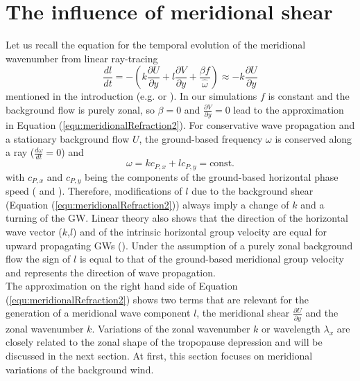 
\section{The influence of meridional shear}
\label{sec:3D_shear}
Let us recall the equation for the temporal evolution of the meridional wavenumber from linear ray-tracing
\begin{equation}
    \frac{dl}{dt} = -(k \frac{\partial U}{\partial y} + l \frac{\partial V}{\partial y} + \frac{\beta f}{\hat{\omega}})
    \approx -k \frac{\partial U}{\partial y}
    \label{equ:meridionalRefraction2}
\end{equation}
mentioned in the introduction (e.g. \cite[]{dunkerton_inertiagravity_1984} or \cite[]{eckermann_ray-tracing_1992}). In our simulations $f$ is constant and the background flow is purely zonal, so $\beta=0$ and $\frac{\partial V}{\partial y}=0$ lead to the approximation in Equation (\ref{equ:meridionalRefraction2}). For conservative wave propagation and a stationary background flow $U$, the ground-based frequency $\omega$ is conserved along a ray ($\frac{d \omega}{d t} = 0$) and 
\begin{equation}
    \omega = k c_{P,x} + l c_{P,y} = \textrm{const.}
    \label{equ:const_omega}
\end{equation}
with $c_{P,x}$ and $c_{P,y}$ being the components of the ground-based horizontal phase speed (\cite[]{lighthill_waves_1978} and \cite[]{eckermann_ray-tracing_1992}). Therefore, modifications of $l$ due to the background shear (Equation (\ref{equ:meridionalRefraction2})) always imply a change of $k$ and a turning of the GW. Linear theory also shows that the direction of the horizontal wave vector ($k$,$l$) and of the intrinsic horizontal group velocity are equal for upward propagating GWs (\cite[]{sato_origins_2009}). Under the assumption of a purely zonal background flow the sign of $l$ is equal to that of the ground-based meridional group velocity and represents the direction of wave propagation.\\
The approximation on the right hand side of Equation (\ref{equ:meridionalRefraction2}) shows two terms that are relevant for the generation of a meridional wave component $l$, the meridional shear $\frac{\partial U}{\partial y}$ and the zonal wavenumber $k$. Variations of the zonal wavenumber $k$ or wavelength $\lambda_x$ are closely related to the zonal shape of the tropopause depression and will be discussed in the next section. At first, this section focuses on meridional variations of the background wind.

